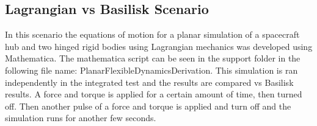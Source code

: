 \subsection{Lagrangian vs Basilisk Scenario}

In this scenario the equations of motion for a planar simulation of a spacecraft hub and two hinged rigid bodies using Lagrangian mechanics was developed using Mathematica. The mathematica script can be seen in the support folder in the following file name: PlanarFlexibleDynamicsDerivation. This simulation is ran independently in the integrated test and the results are compared vs Basilisk results. A force and torque is applied for a certain amount of time, then turned off. Then another pulse of a force and torque is applied and turn off and the simulation runs for another few seconds.



